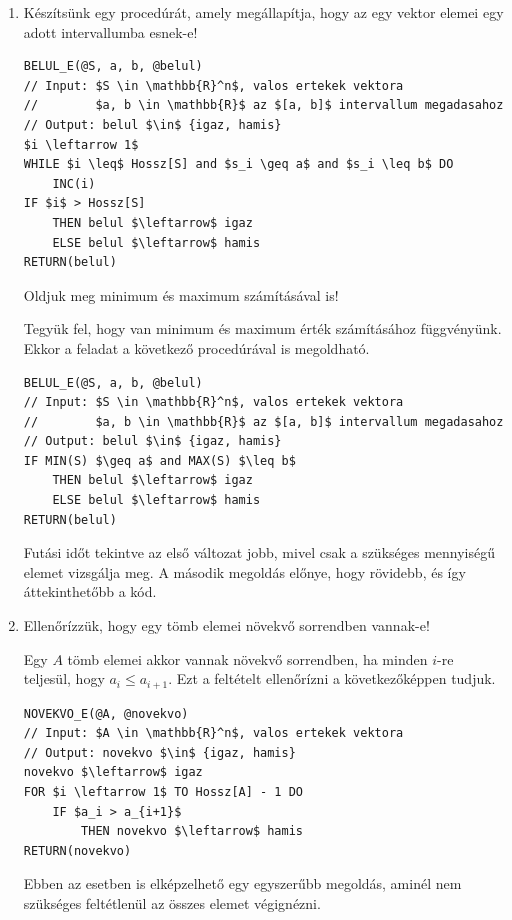 \documentclass[a4paper]{article}
\newenvironment{solution}
{\color{RoyalBlue}}{\bigskip}
\begin{document}
\begin{enumerate}

\item

Készítsünk egy procedúrát, amely megállapítja, hogy az egy vektor elemei egy adott intervallumba esnek-e!

\begin{solution}
\begin{lstlisting}[mathescape]
BELUL_E(@S, a, b, @belul)
// Input: $S \in \mathbb{R}^n$, valos ertekek vektora
//        $a, b \in \mathbb{R}$ az $[a, b]$ intervallum megadasahoz
// Output: belul $\in$ {igaz, hamis}
$i \leftarrow 1$
WHILE $i \leq$ Hossz[S] and $s_i \geq a$ and $s_i \leq b$ DO
    INC(i)
IF $i$ > Hossz[S]
    THEN belul $\leftarrow$ igaz
    ELSE belul $\leftarrow$ hamis
RETURN(belul)
\end{lstlisting}
\end{solution}

\medskip

Oldjuk meg minimum és maximum számításával is!

\begin{solution}
Tegyük fel, hogy van minimum és maximum érték számításához függvényünk. Ekkor a feladat a következő procedúrával is megoldható.

\begin{lstlisting}[mathescape]
BELUL_E(@S, a, b, @belul)
// Input: $S \in \mathbb{R}^n$, valos ertekek vektora
//        $a, b \in \mathbb{R}$ az $[a, b]$ intervallum megadasahoz
// Output: belul $\in$ {igaz, hamis}
IF MIN(S) $\geq a$ and MAX(S) $\leq b$
    THEN belul $\leftarrow$ igaz
    ELSE belul $\leftarrow$ hamis
RETURN(belul)
\end{lstlisting}

Futási időt tekintve az első változat jobb, mivel csak a szükséges mennyiségű elemet vizsgálja meg. A második megoldás előnye, hogy rövidebb, és így áttekinthetőbb a kód.

\end{solution}

\item

Ellenőrízzük, hogy egy tömb elemei növekvő sorrendben vannak-e!

\begin{solution}
Egy $A$ tömb elemei akkor vannak növekvő sorrendben, ha minden $i$-re teljesül, hogy $a_i \leq a_{i+1}$. Ezt a feltételt ellenőrízni a következőképpen tudjuk.
\begin{lstlisting}[mathescape]
NOVEKVO_E(@A, @novekvo)
// Input: $A \in \mathbb{R}^n$, valos ertekek vektora
// Output: novekvo $\in$ {igaz, hamis}
novekvo $\leftarrow$ igaz
FOR $i \leftarrow 1$ TO Hossz[A] - 1 DO
	IF $a_i > a_{i+1}$
	    THEN novekvo $\leftarrow$ hamis
RETURN(novekvo)
\end{lstlisting}
Ebben az esetben is elképzelhető egy egyszerűbb megoldás, aminél nem szükséges feltétlenül az összes elemet végignézni.
\end{solution}


\end{enumerate}
\end{document}
